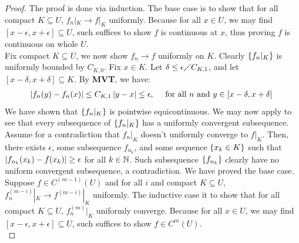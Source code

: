 \documentclass{report}
\begin{document}
\begin{proof}
The proof is done via induction. The base case is to show that for all compact $K \subseteq U$, $f_n|_K \rightarrow f|_K$ uniformly. Because for all $x \in U$, we may find $[x-\epsilon ,x+\epsilon ]\subseteq U$, such suffices to show $f$ is continuous at  $x$, thus proving  $f$ is continuous on whole $U$. \\ 

Fix compact $K \subseteq U$, we now show $f_n \rightarrow f$ uniformly on $K$. Clearly $\left\{ f_n |_K \right\}$ is uniformly bounded by $C_{K,0}$. Fix $x \in K$. Let $\delta \leq \epsilon \diagup C_{K,1}$, and let $[x-\delta,x+\delta] \subseteq K$. By \textbf{MVT}, we have:  
\begin{align*}
 \left|f_n(y)-f_n(x)\right| \leq C_{K,1} \left|y-x\right| \leq \epsilon ,\quad \text{ for all $n$ and $y\in [x-\delta, x+\delta]$ } 
\end{align*}
We have shown that $\left\{ f_n|_K \right\}$ is  pointwise equicontinuous. We may now apply   to see that every subsequence of $\left\{ f_n|_K \right\}$ has a uniformly convergent subsequence. Assume for a contradiction that $f_n |_K$ doesn't uniformly converge to $f|_K$. Then, there exists $\epsilon $, some subsequence $f_{n_k}$, and some sequence $\left\{ x_k \in K \right\}$ such that $\left|f_{n_k}(x_k)- f(x_k)\right|\geq \epsilon $ for all $k\in\mathbb{N}$. Such subsequence $\left\{ f_{n_k} \right\}$ clearly have no uniform convergent subsequence, a contradiction. We have proved the base case.\\

Suppose $f \in C^{(m-1)}(U)$ and for all $i$ and compact  $K \subseteq U$, $f^{(m-i)}_n|_K \rightarrow f^{(m-i)}|_K$ uniformly. The inductive case it to show that for all compact $K \subseteq U$, $f^{(m)}_n |_K$ uniformly converge. Because for all $x \in U$, we may find $[x-\epsilon ,x+\epsilon ]\subseteq U$, such suffices to show $f \in C^m(U)$. \\



\end{proof}
\end{document}
